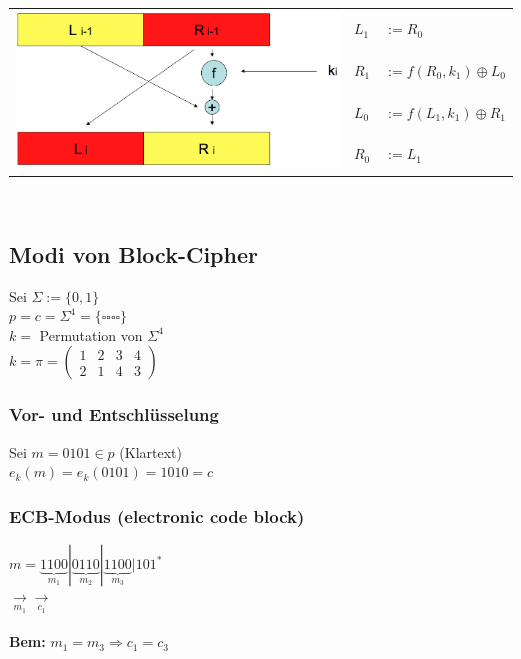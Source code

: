 \documentclass[landscape,twocolumn,a4paper]{article}
\newcommand{\Bold}[1]{\textbf{#1}} %
\newcommand{\Ra}{\Rightarrow}
\newcommand{\Array}[2]{\left(\begin{array}{#1}#2\end{array}\right)} %
\newcommand{\Unten}[2]{\underset{#1}{#2}} %
\begin{document}
\begin{tabular}{l | l l}
	\multirow{4}{*}{\includegraphics[scale=0.12]{horst-feistel.png}} & $L_1$ & $:= R_0$ \\
	&$R_1$ & $:= f(R_0,k_1) \oplus L_0$ \\
	&$L_0$ & $:= f(L_1,k_1) \oplus R_1$ \\
	&$R_0$ & $:= L_1$ \\
\end{tabular} \\
\subsection{Modi von Block-Cipher}
Sei $\Sigma:=\{0,1\}$\\ 
$p=c=\Sigma^4=\{\square\square\square\square\}$\\
$k=$ Permutation von $\Sigma^4$\\
$k=\pi=\Array{cccc}{1&2&3&4\\2&1&4&3}$\\
\subsubsection*{Vor- und Entschlüsselung}
Sei $m=0101\in p$ (Klartext)\\ 
$e_k(m)=e_k(0101)=1010=c$
\subsubsection{ECB-Modus (electronic code block)}
 $m=\underbrace{1100}_{m_1}|\underbrace{0110}_{m_2}|\underbrace{1100}_{m_3}|101^*$\\
 $\Unten{m_1}{\longrightarrow}$$\Unten{c_1}{\longrightarrow}$\\
 \\
 \Bold{Bem:} $m_1=m_3\Ra c_1=c_3$
\end{document}
